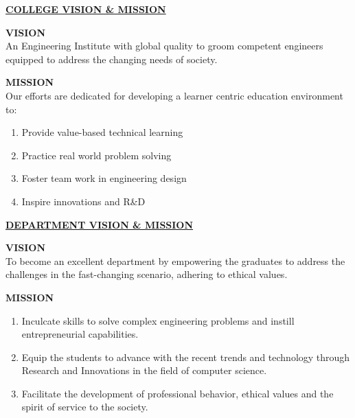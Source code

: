 
 
\newpage
\begin{center}
    \textbf{\underline{COLLEGE VISION \& MISSION}}
\end{center}
\vspace{0.5cm}

\noindent \textbf{VISION} \\[0.2cm]
An Engineering Institute with global quality to groom competent engineers equipped to address the changing needs of society.
\vspace{0.5cm}

\noindent \textbf{MISSION} \\[0.2cm]
Our efforts are dedicated for developing a learner centric education environment to:
\begin{enumerate}
    \item Provide value-based technical learning
    \item Practice real world problem solving
    \item Foster team work in engineering design
    \item Inspire innovations and R\&D
\end{enumerate}
\vspace{1cm}

\begin{center}
    \textbf{\underline{DEPARTMENT VISION \& MISSION}}
\end{center}
\vspace{0.5cm}

\noindent \textbf{VISION} \\[0.2cm]
To become an excellent department by empowering the graduates to address the challenges in the fast-changing scenario, adhering to ethical values.
\vspace{0.5cm}

\noindent \textbf{MISSION} \\[0.2cm]
\begin{enumerate}
    \item Inculcate skills to solve complex engineering problems and instill entrepreneurial capabilities.
    \item Equip the students to advance with the recent trends and technology through Research and Innovations in the field of computer science.
    \item Facilitate the development of professional behavior, ethical values and the spirit of service to the society.
\end{enumerate}


